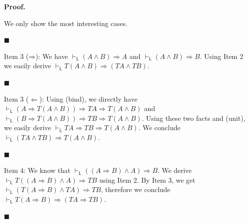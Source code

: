  
\par\medskip\noindent\textbf{Proof.}\par
 
 
We only show the most interesting cases.\par
  
\par\noindent  $\blacksquare$ 
 
Item 3 ($\mathbin{\Rightarrow}$): We have $\vdash_{\mathsf{L}}(A\mathbin{\wedge}B)\mathbin{\Rightarrow}A$ and $\vdash_{\mathsf{L}}(A\mathbin{\wedge}B)\mathbin{\Rightarrow}B$. Using Item 2 we easily derive $\vdash_{\mathsf{L}}T(A\mathbin{\wedge}B)\mathbin{\Rightarrow}(TA\mathbin{\wedge}TB)$.\par
 
 
 
\par\noindent  $\blacksquare$ 
 
Item 3 ($\Leftarrow$): Using (bind), we directly have $\vdash_{\mathsf{L}}(A\mathbin{\Rightarrow}T(A\mathbin{\wedge}B))\mathbin{\Rightarrow}TA\mathbin{\Rightarrow}T(A\mathbin{\wedge}B)$ and $\vdash_{\mathsf{L}}(B\mathbin{\Rightarrow}T(A\mathbin{\wedge}B))\mathbin{\Rightarrow}TB\mathbin{\Rightarrow}T(A\mathbin{\wedge}B)$. Using these two facts and (unit), we easily derive $\vdash_{\mathsf{L}}TA\mathbin{\Rightarrow}TB\mathbin{\Rightarrow}T(A\mathbin{\wedge}B)$. We conclude $\vdash_{\mathsf{L}}(TA\mathbin{\wedge}TB)\mathbin{\Rightarrow}T(A\mathbin{\wedge}B)$.\par
 
 
 
\par\noindent  $\blacksquare$ 
 
Item 4: We know that $\vdash_{\mathsf{L}}((A\mathbin{\Rightarrow}B)\mathbin{\wedge}A)\mathbin{\Rightarrow}B$. We derive $\vdash_{\mathsf{L}}T((A\mathbin{\Rightarrow}B)\mathbin{\wedge}A)\mathbin{\Rightarrow}TB$ using Item 2. By Item 3, we get $\vdash_{\mathsf{L}}(T(A\mathbin{\Rightarrow}B)\mathbin{\wedge}TA)\mathbin{\Rightarrow}TB$, therefore we conclude $\vdash_{\mathsf{L}}T(A\mathbin{\Rightarrow}B)\mathbin{\Rightarrow}(TA\mathbin{\Rightarrow}TB)$.\par
 
 
 
\par\noindent  $\blacksquare$ 
 
